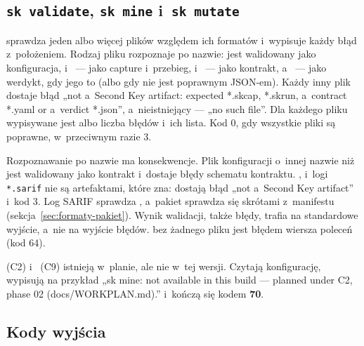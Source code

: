 \subsection{\texttt{sk validate}, \texttt{sk mine} i~\texttt{sk mutate}}\label{sec:cli-validate}

 sprawdza jeden albo więcej plików względem ich formatów i~wypisuje każdy błąd z~położeniem. Rodzaj pliku rozpoznaje po nazwie: 
jest walidowany jako konfiguracja,  i~ --- jako
capture i~przebieg,  i~ --- jako kontrakt, a~ --- jako werdykt, gdy jego  to
 (albo gdy nie jest poprawnym JSON-em). Każdy inny plik dostaje
błąd „not a~Second Key artifact: expected *.skcap, *.skrun, a~contract *.yaml or a~verdict
*.json”, a~nieistniejący --- „no such file”. Dla każdego pliku wypisywane jest
 albo liczba błędów i~ich lista. Kod 0, gdy wszystkie pliki są
poprawne, w~przeciwnym razie 3.

Rozpoznawanie po nazwie ma konsekwencje. Plik konfiguracji o~innej nazwie niż
 jest walidowany jako kontrakt i~dostaje błędy schematu kontraktu.
,  i~logi \texttt{*.sarif} nie są
artefaktami, które  zna: dostają błąd „not a~Second Key artifact”
i~kod 3. Log SARIF sprawdza , a~pakiet sprawdza się skrótami z~manifestu
(sekcja~\ref{sec:formaty-pakiet}). Wynik walidacji, także błędy, trafia na standardowe
wyjście, a~nie na wyjście błędów.  bez żadnego pliku jest błędem
wiersza poleceń (kod 64).

 (C2) i~ (C9) istnieją w~planie, ale nie w~tej wersji.
Czytają konfigurację, wypisują na przykład „sk mine: not available in this build --- planned
under C2, phase 02 (docs/WORKPLAN.md).” i~kończą się kodem \textbf{70}.


\subsection{Kody wyjścia}\label{sec:cli-kody}

